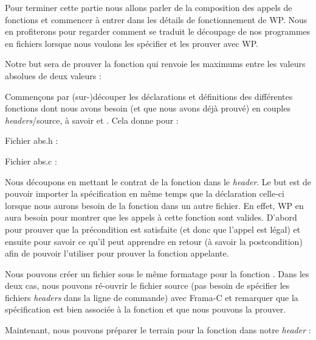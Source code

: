 Pour terminer cette partie nous allons parler de la composition des appels de
fonctions et commencer à entrer dans les détails de fonctionnement de WP. Nous
en profiterons pour regarder comment se traduit le découpage de nos
programmes en fichiers lorsque nous voulons les spécifier et les prouver avec WP.



Notre but sera de prouver la fonction  qui renvoie les maximums
entre les valeurs absolues de deux valeurs :






Commençons par (sur-)découper les déclarations et définitions des différentes
fonctions dont nous avons besoin (et que nous avons déjà prouvé) en couples
\textit{headers}/source, à savoir  et . Cela donne
pour  :



Fichier abs.h :



Fichier abs.c :




Nous découpons en mettant le contrat de la fonction dans le \textit{header}. Le
but est de pouvoir importer la spécification en même temps que la déclaration
celle-ci lorsque nous aurons besoin de la fonction dans un autre fichier. En
effet, WP en aura besoin pour montrer que les appels à cette
fonction sont valides. D'abord pour prouver que la précondition est satisfaite
(et donc que l'appel est légal) et ensuite pour savoir ce qu'il peut apprendre
en retour (à savoir la postcondition) afin de pouvoir l'utiliser pour prouver
la fonction appelante.



Nous pouvons créer un fichier sous le même formatage pour la fonction .
Dans les deux cas, nous pouvons ré-ouvrir le fichier source (pas besoin de
spécifier les fichiers \textit{headers} dans la ligne de commande) avec Frama-C et
remarquer que la spécification est bien associée à la fonction et que nous
pouvons la prouver.



Maintenant, nous pouvons préparer le terrain pour la fonction  dans notre \textit{header} :



